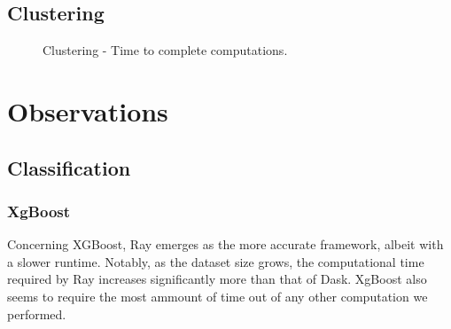 \documentclass[conference]{IEEEtran}
\begin{document}
\subsection{Clustering}
    \begin{figure}[h]
    \centering
    \caption{Clustering - Time to complete computations.}
    \end{figure}
    \begin{table}[ht]
    \centering
    \caption{Clustering Time and DB Score.}
    \end{table}
\FloatBarrier
\section{Observations}
\subsection{Classification}
\subsubsection{XgBoost}
Concerning XGBoost, Ray emerges as the more accurate framework, albeit with a slower runtime. Notably, as the dataset size grows, the computational time required by Ray increases significantly more than that of Dask. XgBoost also seems to require the most ammount of time out of any other computation we performed.
\end{document}
